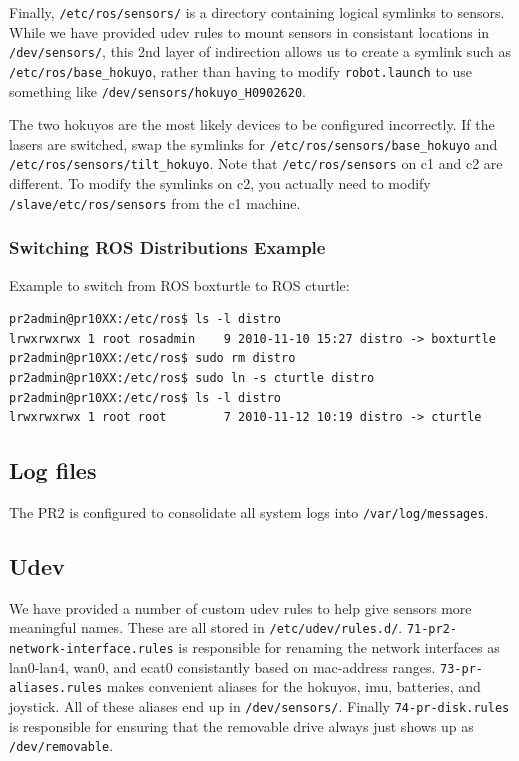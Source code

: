 Finally, \texttt{/etc/ros/sensors/} is a directory containing logical
symlinks to sensors.  While we have provided udev rules to mount
sensors in consistant locations in \texttt{/dev/sensors/}, this 2nd
layer of indirection allows us to create a symlink such as
\texttt{/etc/ros/base\_hokuyo}, rather than having to modify
\texttt{robot.launch} to use something like
\texttt{/dev/sensors/hokuyo\_H0902620}.

The two hokuyos are the most likely devices to be configured
incorrectly.  If the lasers are switched, swap the symlinks for
\texttt{/etc/ros/sensors/base\_hokuyo} and
\texttt{/etc/ros/sensors/tilt\_hokuyo}.  Note that
\texttt{/etc/ros/sensors} on c1 and c2 are different.  To modify the
symlinks on c2, you actually need to modify
\texttt{/slave/etc/ros/sensors} from the c1 machine.

\subsubsection{Switching ROS Distributions Example}

Example to switch from ROS boxturtle to ROS cturtle:
\begin{verbatim}
pr2admin@pr10XX:/etc/ros$ ls -l distro
lrwxrwxrwx 1 root rosadmin    9 2010-11-10 15:27 distro -> boxturtle
pr2admin@pr10XX:/etc/ros$ sudo rm distro
pr2admin@pr10XX:/etc/ros$ sudo ln -s cturtle distro
pr2admin@pr10XX:/etc/ros$ ls -l distro 
lrwxrwxrwx 1 root root        7 2010-11-12 10:19 distro -> cturtle
\end{verbatim}

\subsection{Log files}
The PR2 is configured to consolidate all system logs into
\texttt{/var/log/messages}.

\subsection{Udev}
We have provided a number of custom udev rules to help give sensors
more meaningful names.  These are all stored in
\texttt{/etc/udev/rules.d/}.  \texttt{71-pr2-network-interface.rules}
is responsible for renaming the network interfaces as lan0-lan4, wan0,
and ecat0 consistantly based on mac-address ranges.
\texttt{73-pr-aliases.rules} makes convenient aliases for the hokuyos,
imu, batteries, and joystick.  All of these aliases end up in
\texttt{/dev/sensors/}.  Finally \texttt{74-pr-disk.rules} is
responsible for ensuring that the removable drive always just shows up
as \texttt{/dev/removable}.

